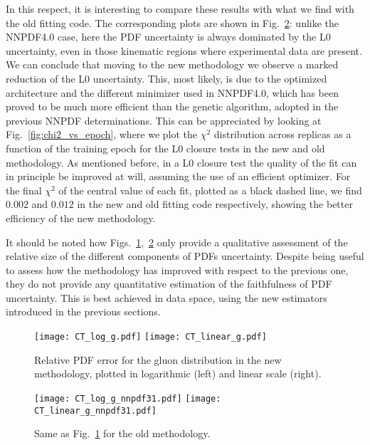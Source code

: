 In this respect, it is interesting to compare these results with what we find
with the old fitting code. The corresponding plots are shown in
Fig.~\ref{fig:CT_uncertainty_g_nnpdf3.1}: unlike the NNPDF4.0 case, here the PDF
uncertainty is always dominated by the L0 uncertainty, even in those kinematic
regions where experimental data are present. We can conclude that moving to the
new methodology we observe a marked reduction of the L0 uncertainty. This, most
likely, is due to the optimized architecture and the different minimizer used in
NNPDF4.0, which has been proved to be much more efficient than the genetic
algorithm, adopted in the previous NNPDF determinations. This can be appreciated
by looking at Fig.~\ref{fig:chi2_vs_epoch}, where we plot the $\chi^2$
distribution across replicas as a function of the training epoch for the L0
closure tests in the new and old methodology. As mentioned before, in a L0
closure test the quality of the fit can in principle be improved at will,
assuming the use of an efficient optimizer. For the final $\chi^2$ of the
central value of each fit, plotted as a black dashed line, we find $0.002$ and
$0.012$ in the new and old fitting code respectively, showing the better
efficiency of the new methodology. 

It should be noted how
Figs.~\ref{fig:CT_uncertainty_g},~\ref{fig:CT_uncertainty_g_nnpdf3.1} only
provide a qualitative assessment of the relative size of the different
components of PDFs uncertainty. Despite being useful to assess how the
methodology has improved with respect to the previous one, they do not provide
any quantitative estimation of the faithfulness of PDF uncertainty. This is best
achieved in data space, using the new estimators introduced in the previous
sections.

\begin{figure}[h]
    \centering
    \texttt{[image: CT\_log\_g.pdf]}
    \texttt{[image: CT\_linear\_g.pdf]}
    \caption{Relative PDF error for the gluon distribution in the new
    methodology, plotted in logarithmic (left) and linear scale (right).}
    \label{fig:CT_uncertainty_g}    
\end{figure}

\begin{figure}[h]
    \centering
    \texttt{[image: CT\_log\_g\_nnpdf31.pdf]}
    \texttt{[image: CT\_linear\_g\_nnpdf31.pdf]}
    \caption{Same as Fig.~\ref{fig:CT_uncertainty_g} for the old methodology.}
    \label{fig:CT_uncertainty_g_nnpdf3.1}    
\end{figure}

